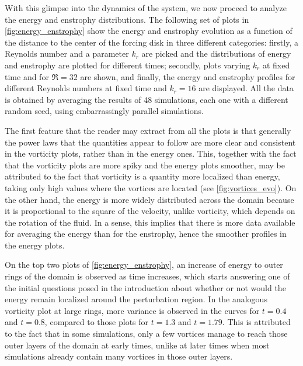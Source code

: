 \documentclass[../main.tex]{subfiles}
\begin{document}
With this glimpse into the dynamics of the system, we now proceed to analyze the energy and enstrophy distributions. The following set of plots in \cref{fig:energy_enstrophy} show the energy and enstrophy evolution as a function of the distance to the center of the forcing disk in three different categories: firstly, a Reynolds number and a parameter $k_r$ are picked and the distributions of energy and enstrophy are plotted for different times; secondly, plots varying $k_r$ at fixed time and for $\Re=32$ are shown, and finally, the energy and enstrophy profiles for different Reynolds numbers at fixed time and $k_r=16$ are displayed. All the data is obtained by averaging the results of 48 simulations, each one with a different random seed, using embarrassingly parallel simulations.

The first feature that the reader may extract from all the plots is that generally the power laws that the quantities appear to follow are more clear and consistent in the vorticity plots, rather than in the energy ones. This, together with the fact that the vorticity plots are more spiky and the energy plots smoother, may be attributed to the fact that vorticity is a quantity more localized than energy, taking only high values where the vortices are located (see \cref{fig:vortices_evo}). On the other hand, the energy is more widely distributed across the domain because it is proportional to the square of the velocity, unlike vorticity, which depends on the rotation of the fluid. In a sense, this implies that there is more data available for averaging the energy than for the enstrophy, hence the smoother profiles in the energy plots.

On the top two plots of \cref{fig:energy_enstrophy}, an increase of energy to outer rings of the domain is observed as time increases, which starts answering one of the initial questions posed in the introduction about whether or not would the energy remain localized around the perturbation region. In the analogous vorticity plot at large rings, more variance is observed in the curves for $t=0.4$ and $t=0.8$, compared to those plots for $t=1.3$ and $t=1.79$. This is attributed to the fact that in some simulations, only a few vortices manage to reach those outer layers of the domain at early times, unlike at later times when most simulations already contain many vortices in those outer layers.
\end{document}
